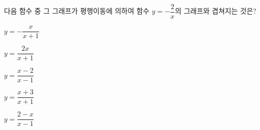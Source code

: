 \hspace*{2mm}\begin{minipage}[t]{\dimexpr\linewidth-2mm\relax}\vspace{0pt}
다음 함수 중 그 그래프가 평행이동에 의하여 함수 $y=-\dfrac{2}{x}$의 그래프와 겹쳐지는 것은?
\begin{choicesii}{\rule[-3ex]{0pt}{8ex}$y=-\dfrac{x}{x+1}$}{\rule[-3ex]{0pt}{8ex}$y=\dfrac{2x}{x+1}$}{\rule[-3ex]{0pt}{8ex}$y=\dfrac{x-2}{x-1}$}{\rule[-3ex]{0pt}{8ex}$y=\dfrac{x+3}{x+1}$}{\rule[-3ex]{0pt}{8ex}$y=\dfrac{2-x}{x-1}$}\end{choicesii}\end{minipage}
